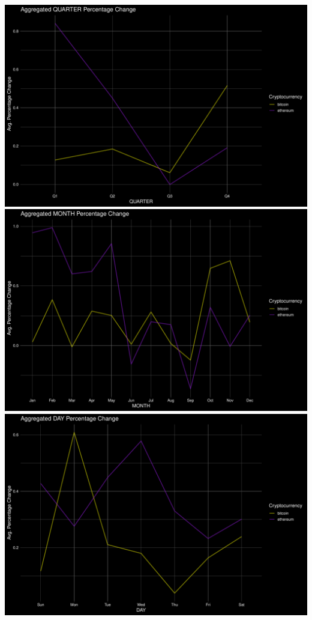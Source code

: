 \documentclass[
]{article}
\begin{document}
\includegraphics{Crypto_ETL_files/figure-latex/agg plot mom dod qoq code 2 -1.pdf}
\includegraphics{Crypto_ETL_files/figure-latex/agg plot mom dod qoq code 2 -2.pdf}
\includegraphics{Crypto_ETL_files/figure-latex/agg plot mom dod qoq code 2 -3.pdf}
\end{document}
